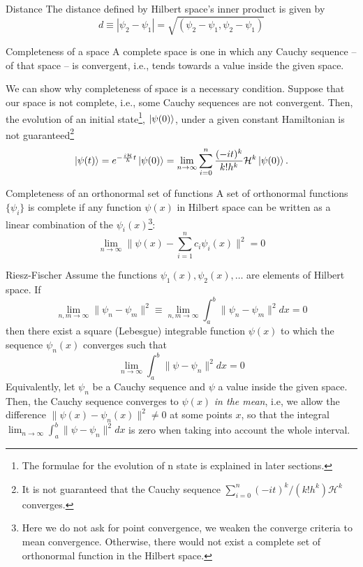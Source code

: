 \begin{definition}{Distance}{}
    The distance defined by Hilbert space's inner product is given by
    \begin{equation}
      d \equiv \left|\psi_{2} - \psi_{1}\right| = \sqrt{(\psi_{2}-\psi_{1},\psi_{2}-\psi_{1})}  
    \end{equation}
\end{definition}
\begin{definition}{Completeness of a space}{}
A complete space is one in which any Cauchy sequence -- of that space -- is convergent, i.e., tends towards a value inside the given space.
\end{definition}
We can show why completeness of space is a necessary condition. Suppose that our space is not complete, i.e., some Cauchy sequences are not convergent. Then, the evolution of an initial state\footnote{The formulae for the evolution of n state is explained in later sections.}, $\ket{\psi(0)}$, under a given constant Hamiltonian is not guaranteed\footnote{It is not guaranteed that the Cauchy sequence $\sum_{i = 0}^{n}(-it)^{k} / \left(k!h^{k}\right)\mathcal{H}^{k}$ converges.}
\begin{equation}
    \ket{\psi(t)} = e^{-\frac{i\mathcal{H}}{\hbar}t}\ket{\psi(0)} = \lim_{n \to \infty} \sum_{i = 0}^{n}\frac{(-it)^{k}}{k!h^{k}}\mathcal{H}^{k}\ket{\psi(0)}.
\end{equation}
\begin{definition}{Completeness of an orthonormal set of functions}{}
A set of orthonormal functions $\{\psi_{i}\}$ is complete if any function $\psi(x)$ in Hilbert space can be written as a linear combination of the $\psi_{i}(x)$\footnote{Here we do not ask for point convergence, we weaken the converge criteria to mean convergence. Otherwise, there would not exist a complete set of orthonormal function in the Hilbert space.}:
\begin{equation}
    \lim_{n\to \infty}\| \psi(x) - \sum_{i=1}^{n}c_{i}\psi_{i}(x)\|^{2} = 0
\end{equation}
\end{definition}
\begin{theorem}{Riesz-Fischer}{}
Assume the functions $\psi_{1}(x),\psi_{2}(x),\ldots$ are elements of Hilbert space. If
\begin{equation}
    \lim_{n,m\to\infty} \lVert \psi_{n} - \psi_{m}\rVert^{2} \equiv \lim_{n,m\to \infty} \int_{a}^{b} \|\psi_{n} - \psi_{m}\|^{2}dx = 0
\end{equation}
then there exist a square (Lebesgue) integrable function $\psi(x)$ to which the sequence $\psi_{n}(x)$ converges such that 
\begin{equation}
    \lim_{n\to \infty} \int_{a}^{b} \|\psi - \psi_{n}\|^{2}dx = 0
\end{equation}
Equivalently, let $\psi_{n}$ be a Cauchy sequence and $\psi$ a value inside the given space. Then, the Cauchy sequence converges to $\psi(x)$ \textit{in the mean}, i.e, we allow the difference $\|\psi(x) - \psi_{n}(x)\|^{2}\neq 0$ at some points $x$, so that the integral $\lim_{n\to \infty} \int_{a}^{b} \|\psi - \psi_{n}\|^{2}dx$ is zero when taking into account the whole interval.
\end{theorem}
